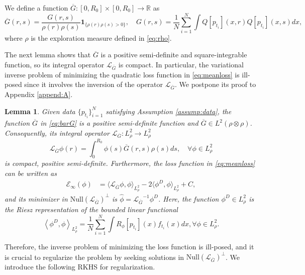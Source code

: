 \documentclass[12pt]{article}
\def\R{\mathbb{R}}
\def\Gbar{ {\overline{G}} }
\def\LGbar{ {\mathcal{L}_{\overline{G}}}  }
\newcommand{\innerp}[1]{\langle{#1}\rangle}
\newtheorem{lemma}[theorem]{Lemma}
\numberwithin{equation}{section}
\numberwithin{theorem}{section}
\begin{document}
We define a function $\Gbar:[0,R_0]\times [0,R_0]\to \R$ as 
\begin{equation}
\label{eq:barG}
\Gbar(r, s)=\frac{G(r, s)}{\rho(r) \rho(s)}\mathbf{1}_{\{ \rho(r) \rho(s)>0 \} }, \quad G(r, s)=\frac{1}{N} \sum_{i=1}^N \int Q[p_{t_i}](x, r)Q[p_{t_i}](x, s) d x, 
\end{equation}
where $\rho$ is the exploration measure defined in \eqref{eq:rho}. 

The next lemma shows that $\Gbar$ is a positive semi-definite and square-integrable function, so its integral operator $\LGbar$ is compact. In particular, the variational inverse problem of minimizing the quadratic loss function in \eqref{eq:meanloss} is ill-posed since it involves the inversion of the operator $\LGbar$. We postpone its proof to Appendix \ref{append:A}. 
\begin{lemma} \label{lemma:rk}
Given data $\{p_{t_i}\}_{i=1}^N$ satisfying {\rm Assumption \ref{assump:data}}, the function $\Gbar$ in \eqref{eq:barG} is a positive semi-definite function and $\Gbar\in L^2(\rho\otimes \rho)$. Consequently, its integral operator $\LGbar:L^2_\rho\to L^2_\rho$ 
\begin{equation}\label{eq:LGbar}
\LGbar \phi (r)=\int_0^{R_0} \phi(s) \Gbar(r, s) \rho(s) d s, \quad \forall \phi\in L^2_\rho
\end{equation}   
is compact, positive semi-definite. Furthermore, the loss function in \eqref{eq:meanloss} can be written as 
\begin{equation} \label{eq:lossFn_LG}
\begin{aligned}
\mathcal{E}_\infty \left({\phi}\right) 
  & = \innerp{\LGbar \phi, \phi}_{L^2_\rho} - 2\innerp{\phi^D, \phi}_{L^2_\rho} + C, 
\end{aligned}
\end{equation}
and its minimizer in $\mathrm{Null}(\LGbar)^\perp$ is $\widehat \phi = \LGbar^{-1} \phi^D$. Here, the function $\phi^D\in L^2_\rho$ is the Riesz representation of the bounded linear functional  
\begin{equation}
 \label{eq:phiD}
\left\langle \phi^D, \phi\right\rangle_{L^2_{\rho}}=\frac{1}{N} \sum_{i=1}^N \int  R_{\phi}\left[p_{t_i}\right](x) f_{t_i}(x) d x, \forall \phi \in L^2_{\rho} .
\end{equation}
\end{lemma}



Therefore, the inverse problem of minimizing the loss function is ill-posed, and it is crucial to regularize the problem by seeking solutions in $\mathrm{Null}(\LGbar)^\perp$. We introduce the following RKHS for regularization.     
\end{document}
